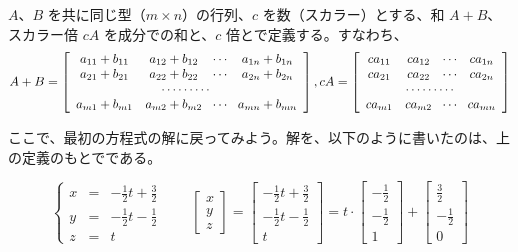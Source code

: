 \begin{definition}
$A$、$B$ を共に同じ型（$m\times n$）の行列、$c$ を数（スカラー）とする、{\gt 和 $A + B$}、{\gt スカラー倍 $cA$} を成分での和と、$c$ 倍とで定義する。すなわち、
$$A + B = \left[\begin{array}{cccc}
a_{11} + b_{11} & a_{12} + b_{12} & \!\cdots\! & a_{1n} + b_{1n}\\
a_{21} + b_{21} & a_{22} + b_{22} & \!\cdots\! & a_{2n} + b_{2n}\\
\multicolumn{4}{c}{\cdots\cdots\cdots}\\
a_{m1} + b_{m1} & a_{m2} + b_{m2} & \!\cdots\!  & a_{mn} +b_{mn}\\
\end{array}
\right],
cA = \left[\begin{array}{cccc}
ca_{11} & ca_{12} & \!\cdots\!  & ca_{1n}\\
ca_{21} & ca_{22} & \!\cdots\!  & ca_{2n} \\
\multicolumn{4}{c}{\cdots\cdots\cdots}\\
ca_{m1} & ca_{m2} & \!\cdots\!  & ca_{mn} \\
\end{array}
\right]$$
\end{definition}

ここで、最初の方程式の解に戻ってみよう。解を、以下のように書いたのは、上の定義のもとでである。

$$\left\{\begin{array}{rcl}
x & = & -\frac12t + \frac32\\
y & = & -\frac12t - \frac12\\
z & = & t
\end{array}\right. \qquad
\left[\begin{array}{r}
x \\ y \\ z 
\end{array}\right] =
\left[\begin{array}{r}
-\frac12 t + \frac32 \\ -\frac12 t - \frac12 \\ t
\end{array}\right] =
t\cdot \left[\begin{array}{r}
-\frac12 \\ -\frac12 \\ 1
\end{array}\right]  + 
\left[\begin{array}{r}
\frac32 \\ -\frac12 \\ 0 
\end{array}\right] $$


